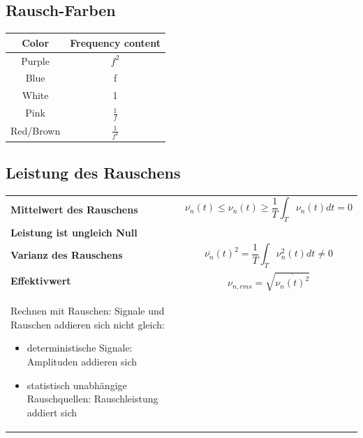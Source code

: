 \subsection{Rausch-Farben}
\begin{tabular}{|c|c|}
\hline
\textbf{Color}&\textbf{Frequency content}\\\hline
Purple&$f^2$\\\hline
Blue&f\\\hline
White&1\\\hline
Pink&$\frac{1}{f}$\\\hline
Red/Brown&$\frac{1}{f^2}$\\\hline
\end{tabular}

\subsection{Leistung des Rauschens}
\begin{tabular}{ll}
\textbf{Mittelwert des Rauschens}&
\begin{minipage}{9cm}
\begin{equation*}
\overline{\nu_{n}}(t)\leq \nu_{n}(t)\geq \frac{1}{T}\int_{T}\nu_{n}(t)dt=0
\end{equation*}
\end{minipage}
\\
\textbf{Leistung ist ungleich Null}&\\
\textbf{Varianz des Rauschens}&
\begin{minipage}{9cm}
\begin{equation*}
\overline{\nu_{n}}(t)^2=\frac{1}{T}\int_{T}\nu^2_{n}(t)dt\neq0
\end{equation*}
\end{minipage}
\\
\textbf{Effektivwert}&
\begin{minipage}{9cm}
\begin{equation*}
\nu_{n,rms}=\sqrt{\overline{\nu_{n}(t)^2}}
\end{equation*}
\end{minipage}
\\
\begin{minipage}{9cm}
Rechnen mit Rauschen: Signale und Rauschen addieren sich nicht gleich:
\begin{itemize}
  \item deterministische Signale: Amplituden addieren sich
  \item statistisch unabhängige Rauschquellen: Rauschleistung addiert sich
\end{itemize}
\end{minipage}
&
\\
\end{tabular}

